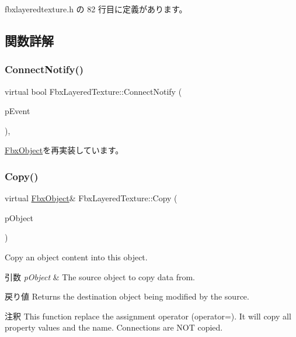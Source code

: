  fbxlayeredtexture.\+h の 82 行目に定義があります。



\subsection{関数詳解}
\mbox{\label{class_fbx_layered_texture_a78ed9cd6298697060ebc278617d72d44}} 
\subsubsection{\texorpdfstring{Connect\+Notify()}{ConnectNotify()}}
{\footnotesize\ttfamily virtual bool Fbx\+Layered\+Texture\+::\+Connect\+Notify (\begin{DoxyParamCaption}\item[{\hyperlink{class_fbx_connect_event}{Fbx\+Connect\+Event} const \&}]{p\+Event }\end{DoxyParamCaption})\hspace{0.3cm}{\ttfamily [protected]}, {\ttfamily [virtual]}}



\hyperlink{class_fbx_object_ab7a400f3829d1f0da57d3d78c8168dd0}{Fbx\+Object}を再実装しています。

\mbox{\label{class_fbx_layered_texture_a61ca1d210dcae83133ad2ee1c9c7daa9}} 
\subsubsection{\texorpdfstring{Copy()}{Copy()}}
{\footnotesize\ttfamily virtual \hyperlink{class_fbx_object}{Fbx\+Object}\& Fbx\+Layered\+Texture\+::\+Copy (\begin{DoxyParamCaption}\item[{const \hyperlink{class_fbx_object}{Fbx\+Object} \&}]{p\+Object }\end{DoxyParamCaption})\hspace{0.3cm}{\ttfamily [virtual]}}

Copy an object content into this object. 
\begin{DoxyParams}{引数}
{\em p\+Object} & The source object to copy data from. \\
\hline
\end{DoxyParams}
\begin{DoxyReturn}{戻り値}
Returns the destination object being modified by the source. 
\end{DoxyReturn}
\begin{DoxyRemark}{注釈}
This function replace the assignment operator (operator=). It will copy all property values and the name. Connections are N\+OT copied. 
\end{DoxyRemark}


